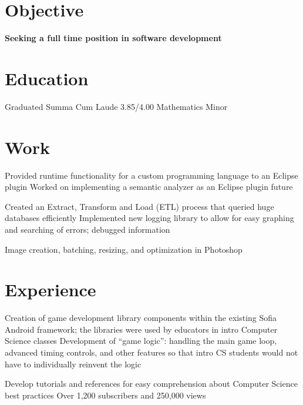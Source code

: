 \documentclass{my_cv}
\begin{document}

\section{Objective}
\workitemsone
{\textbf{Seeking a full time position in software development}}

\section{Education}
\workitemstwo
{Graduated Summa Cum Laude 3.85/4.00 }
{Mathematics Minor}
 
\section{Work}
\workitemstwo
{Provided runtime functionality for a custom programming language to an Eclipse plugin}
{Worked on implementing a semantic analyzer as an Eclipse plugin future}

\workitemstwo
{Created an Extract, Transform and Load (ETL) process that queried huge databases efficiently  }
{Implemented new logging library to allow for easy graphing and searching of errors; debugged information}

\workitemsone
{Image creation, batching, resizing, and optimization in Photoshop}

\section{Experience}
\workitemstwo
{Creation of game development library components within the existing Sofia Android framework; the libraries were used by educators in intro Computer Science classes }
{Development of “game logic”: handling the main game loop, advanced timing controls, and other features so that intro CS students would not have to individually reinvent the logic}

\workitemstwo
{Develop tutorials and references for easy comprehension about Computer Science best practices }
{Over 1,200 subscribers and 250,000 views}
\end{document}
